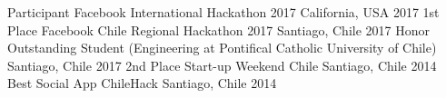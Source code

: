 \begin{cvhonors}
  \cvhonor
    {Participant}
    {Facebook International Hackathon 2017}
    {California, USA}
    {2017}
  \cvhonor
    {1st Place}
    {Facebook Chile Regional Hackathon 2017}
    {Santiago, Chile}
    {2017}
  \cvhonor
    {Honor}
    {Outstanding Student (Engineering at Pontifical Catholic University of Chile)}
    {Santiago, Chile}
    {2017}
  \cvhonor
    {2nd Place}
    {Start-up Weekend Chile}
    {Santiago, Chile}
    {2014}
  \cvhonor
    {Best Social App}
    {ChileHack}
    {Santiago, Chile}
    {2014}
\end{cvhonors}
